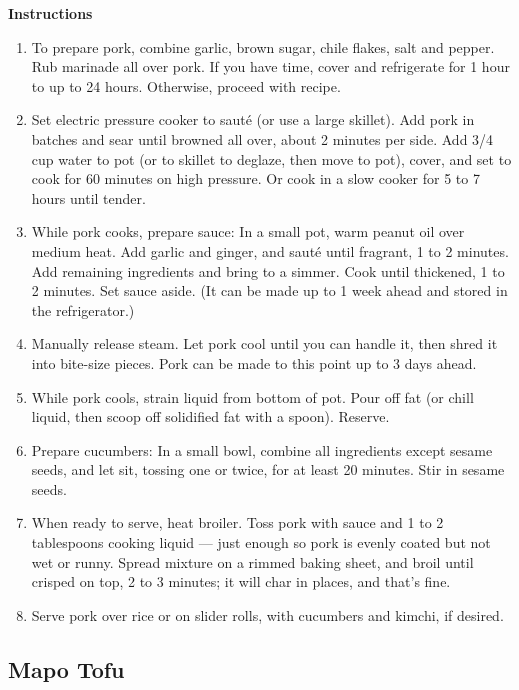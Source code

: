 \documentclass{article}
\numberwithin{figure}{section}
\numberwithin{equation}{section}
\begin{document}
{\bf Instructions}
\begin{enumerate}
\item To prepare pork, combine garlic, brown sugar, chile flakes, salt and pepper. Rub marinade all over pork. If you have time, cover and refrigerate for 1 hour to up to 24 hours. Otherwise, proceed with recipe.

\item Set electric pressure cooker to sauté (or use a large skillet). Add pork in batches and sear until browned all over, about 2 minutes per side. Add 3/4 cup water to pot (or to skillet to deglaze, then move to pot), cover, and set to cook for 60 minutes on high pressure. Or cook in a slow cooker for 5 to 7 hours until tender.

\item While pork cooks, prepare sauce: In a small pot, warm peanut oil over medium heat. Add garlic and ginger, and sauté until fragrant, 1 to 2 minutes. Add remaining ingredients and bring to a simmer. Cook until thickened, 1 to 2 minutes. Set sauce aside. (It can be made up to 1 week ahead and stored in the refrigerator.)

\item Manually release steam. Let pork cool until you can handle it, then shred it into bite-size pieces. Pork can be made to this point up to 3 days ahead.

\item While pork cools, strain liquid from bottom of pot. Pour off fat (or chill liquid, then scoop off solidified fat with a spoon). Reserve.

\item Prepare cucumbers: In a small bowl, combine all ingredients except sesame seeds, and let sit, tossing one or twice, for at least 20 minutes. Stir in sesame seeds.

\item When ready to serve, heat broiler. Toss pork with sauce and 1 to 2 tablespoons cooking liquid — just enough so pork is evenly coated but not wet or runny. Spread mixture on a rimmed baking sheet, and broil until crisped on top, 2 to 3 minutes; it will char in places, and that's fine.

\item Serve pork over rice or on slider rolls, with cucumbers and kimchi, if desired.
\end{enumerate}


\pagebreak
\subsection{Mapo Tofu}
\end{document}
